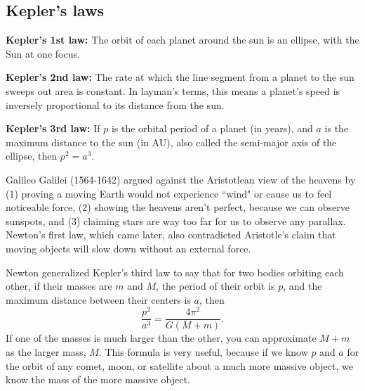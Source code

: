 \documentclass[class=article, crop=false]{standalone}
\begin{document}
\subsection{Kepler's laws}
\textbf{Kepler's 1st law:} The orbit of each planet around the sun is an ellipse, with the Sun at one focus.
\par
\textbf{Kepler's 2nd law:} The rate at which the line segment from a planet to the sun sweeps out area is constant. In layman's terms, this means a planet's speed is inversely proportional to its distance from the sun.
\par
\textbf{Kepler's 3rd law:} If $p$ is the orbital period of a planet (in years), and $a$ is the maximum distance to the sun (in AU), also called the semi-major axis of the ellipse, then $p^2=a^3$.
\par
Galileo Galilei (1564-1642) argued against the Aristotlean view of the heavens by (1) proving a moving Earth would not experience ``wind" or cause us to feel noticeable force, (2) showing the heavens aren't perfect, because we can observe sunspots, and (3) claiming stars are way too far for us to observe any parallax. Newton's first law, which came later, also contradicted Aristotle's claim that moving objects will slow down without an external force.
\par
Newton generalized Kepler's third law to say that for two bodies orbiting each other, if their masses are $m$ and $M$, the period of their orbit is $p$, and the maximum distance between their centers is $a$, then
\[ \frac{p^2}{a^3} = \frac{4\pi^2}{G (M+m)}. \]
If one of the masses is much larger than the other, you can approximate $M+m$ as the larger mass, $M$. This formula is very useful, because if we know $p$ and $a$ for the orbit of any comet, moon, or satellite about a much more massive object, we know the mass of the more massive object.
\end{document}
